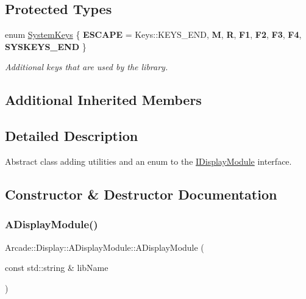 \subsection*{Protected Types}
\begin{DoxyCompactItemize}
\item 
\mbox{\label{classArcade_1_1Display_1_1ADisplayModule_ac438501e449afdad548b42ee2897eabc}} 
enum \mbox{\hyperlink{classArcade_1_1Display_1_1ADisplayModule_ac438501e449afdad548b42ee2897eabc}{System\+Keys}} \{ \newline
{\bfseries E\+S\+C\+A\+PE} = Keys\+::K\+E\+Y\+S\+\_\+\+E\+ND, 
{\bfseries M}, 
{\bfseries R}, 
{\bfseries F1}, 
\newline
{\bfseries F2}, 
{\bfseries F3}, 
{\bfseries F4}, 
{\bfseries S\+Y\+S\+K\+E\+Y\+S\+\_\+\+E\+ND}
 \}
\begin{DoxyCompactList}\small\item\em Additional keys that are used by the library. \end{DoxyCompactList}\end{DoxyCompactItemize}
\subsection*{Additional Inherited Members}


\subsection{Detailed Description}
Abstract class adding utilities and an enum to the \mbox{\hyperlink{classArcade_1_1Display_1_1IDisplayModule}{I\+Display\+Module}} interface. 

\subsection{Constructor \& Destructor Documentation}
\mbox{\label{classArcade_1_1Display_1_1ADisplayModule_a0aee6322d97b3a421e301c8f0830733e}} 
\subsubsection{\texorpdfstring{ADisplayModule()}{ADisplayModule()}}
{\footnotesize\ttfamily Arcade\+::\+Display\+::\+A\+Display\+Module\+::\+A\+Display\+Module (\begin{DoxyParamCaption}\item[{const std\+::string \&}]{lib\+Name }\end{DoxyParamCaption})}



